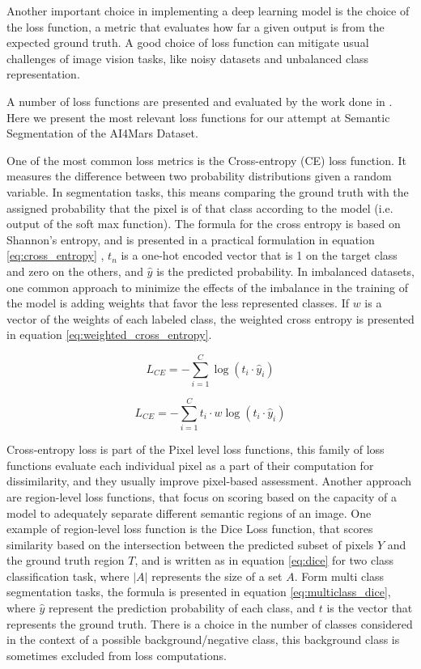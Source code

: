 \documentclass[10pt, conference]{IEEEtran}
\begin{document}
Another important choice in implementing a deep learning model is the choice 
of the loss function, a metric that evaluates how far a given output is 
from the expected ground truth. A good choice of loss function can 
mitigate usual challenges of image vision tasks, like noisy datasets 
and unbalanced class representation. 

A number of loss functions are presented and evaluated by the work done 
in \cite{Azad2023}. Here we present the most relevant loss functions for 
our attempt at Semantic Segmentation of the AI4Mars Dataset.

One of the most common loss metrics is the Cross-entropy (CE) loss 
function. It measures the difference between two probability 
distributions given a random variable. In segmentation tasks, this means 
comparing the ground truth with the assigned probability that the pixel
is of that class according to the model (i.e. output of the soft max function).
The formula for the cross entropy is based on Shannon's entropy, and is presented
in a practical formulation in equation \ref{eq:cross_entropy} , $t_n$ is a one-hot
encoded vector that is 1 on the target class and zero on the others, and $\hat{y}$ is the
predicted probability.  In imbalanced datasets, one common approach to minimize the
effects of the imbalance in the training of the model is adding weights that favor the
less represented classes. If $w$ is a vector of the weights of each labeled class,
the weighted cross entropy is presented in equation \ref{eq:weighted_cross_entropy}.


\begin{equation}
  L_{CE} = -\sum_{i=1}^{C} \log(t_i \cdot \hat{y}_i)
  \label{eq:cross_entropy}
\end{equation}


\begin{equation}
  L_{CE} = -\sum_{i=1}^{C} t_i \cdot w \log(t_i \cdot \hat{y}_i)
  \label{eq:weighted_cross_entropy}
\end{equation}

Cross-entropy loss is part of the Pixel level loss functions, this family of loss functions
evaluate each individual pixel as a part of their computation for dissimilarity, and they usually
improve pixel-based assessment. Another approach are region-level loss functions, that focus
on scoring based on the capacity of  a model to adequately separate different semantic regions of
an image. One example of region-level loss function is the Dice Loss function, that scores
similarity based on the intersection between the predicted subset of pixels $Y$ and the ground
truth region $T$, and is written as in equation \ref{eq:dice} for two class classification task, where
$|A|$ represents the size of a set $A$.
Form multi class segmentation tasks, the formula is presented in equation \ref{eq:multiclass_dice},
where $\hat{y}$ represent the prediction probability of each class, and $t$ is the vector that
represents the ground truth. There is a choice in the number of classes considered in the context
of a possible background/negative class, this background class is sometimes excluded from loss computations.
\end{document}

